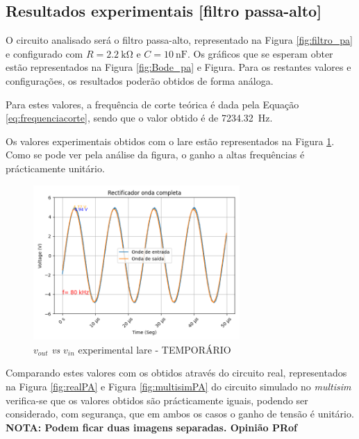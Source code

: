 \subsection{Resultados experimentais [filtro passa-alto]}
\label{sec:resultados_filtros_passaalto}
O circuito analisado será o filtro passa-alto, representado na Figura \ref{fig:filtro_pa} e configurado com $R=\SI{2.2}{\kilo\ohm}$ e $C=\SI{10}{\nano\farad}$. Os gráficos que se esperam obter estão representados na Figura \ref{fig:Bode_pa} e Figura{}. Para os restantes valores e configurações, os resultados poderão obtidos de forma análoga.

Para estes valores, a frequência de corte teórica é dada pela Equação \ref{eq:frequenciacorte}, sendo que o valor obtido é de \SI{7234.32}{\hertz}.

Os valores experimentais obtidos com o \acrshort{lare} estão representados na Figura \ref{fig:voutvinlare}. Como se pode ver pela análise da figura, o ganho a altas frequências é prácticamente unitário.

\begin{figure}[hbtp]
	\centering
	\includegraphics[width=0.7\textwidth]{figures/filtro_passa-alto.png}
	\caption{$v_{out}$ \textit{vs} $v_{in}$ experimental \acrshort{lare} - TEMPORÁRIO}
	\label{fig:voutvinlare}
\end{figure}

Comparando estes valores com os obtidos através do circuito real, representados na Figura \ref{fig:realPA} e Figura \ref{fig:multisimPA} do circuito simulado no \textit{multisim} verifica-se que os valores obtidos são prácticamente iguais, podendo ser considerado, com segurança, que em ambos os casos o ganho de tensão é unitário. \textbf{NOTA: Podem ficar duas imagens separadas. Opinião PRof}

